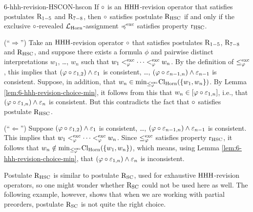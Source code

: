 \begin{thm}{}{6-hhh-revision-HSCON-hscon}%
	If $\circ$ is an ${\mathrm{HHH}}$-revision operator that satisfies postulates $\mathrm{R}_{1-5}$ and $\mathrm{R}_{7-8}$,
	then $\circ$ satisfies postulate $\mathrm{R}_{{\mathrm{HSC}}}$
	if and only if
	the exclusive $\circ$-revealed $\mathcal{L}_{\mathrm{Horn}}$-assignment 
	$\preccurlyeq^{{\operatorname{exc}}}$ satisfies property $\mathrm{r}_{{\mathrm{HSC}}}$.
\end{thm}
\begin{prf*}{}{}%
	(``$\Rightarrow$'')
	Take an ${\mathrm{HHH}}$-revision operator $\circ$ that
	satisfies postulates $\mathrm{R}_{1-5}$, $\mathrm{R}_{7-8}$ and $\mathrm{R}_{{\mathrm{HSC}}}$,
	and suppose there exists a formula $\phi$
	and pairwise distinct interpretations 
	$w_1$, \dots, $w_n$ such that
	$w_1 <^{{\operatorname{exc}}}_{\varphi}\dots <^{{\operatorname{exc}}}_{\varphi} w_n$.
	By the definition of $\le^{{\operatorname{exc}}}_{\varphi}$,
	this implies that 
	$(\varphi\circ\varepsilon_{1,2})\land\varepsilon_{1}$ is consistent,
	\dots,
	$(\varphi\circ\varepsilon_{n-1,n})\land\varepsilon_{n-1}$ is consistent.
	Suppose, in addition, that $w_n \in{\operatorname{min}}_{\le^{{\operatorname{exc}}}_{\varphi}}{\operatorname{Cl}}_{\mathrm{Horn}}(\{w_1,w_n\})$.
	By Lemma \ref{lem:6-hhh-revision-choice-min},
	it follows from this that $w_n\in[\varphi\circ\varepsilon_{1,n}]$,
	i.e., that $(\varphi\circ\varepsilon_{1,n})\land\varepsilon_{n}$ is consistent.
	But this contradicts the fact that $\circ$ satisfies postulate $\mathrm{R}_{{\mathrm{HSC}}}$.

	(``$\Leftarrow$'')
	Suppose
	$(\varphi\circ\varepsilon_{1,2})\land\varepsilon_{1}$ is consistent,
	\dots,
	$(\varphi\circ\varepsilon_{n-1,n})\land\varepsilon_{n-1}$ is consistent.
	This implies that 
	$w_1 <^{{\operatorname{exc}}}_{\varphi}\dots <^{{\operatorname{exc}}}_{\varphi} w_n$.
	Since $\le^{{\operatorname{exc}}}_{\varphi}$ satisfies property $\mathrm{r}_{{\mathrm{HSC}}}$,
	it follows that 
	$w_n \notin{\operatorname{min}}_{\le^{{\operatorname{exc}}}_{\varphi}}{\operatorname{Cl}}_{\mathrm{Horn}}(\{w_1,w_n\})$,
	which means, using Lemma \ref{lem:6-hhh-revision-choice-min},
	that $(\varphi\circ\varepsilon_{1,n})\land\varepsilon_{n}$ is inconsistent.
\end{prf*}

Postulate $\mathrm{R}_{{\mathrm{HSC}}}$ is similar to postulate $\mathrm{R}_{{\mathrm{SC}}}$, used 
for exhaustive ${\mathrm{HHH}}$-revision operators,
so one might wonder whether $\mathrm{R}_{{\mathrm{SC}}}$ could not be used here as well.
The following example, however, shows that when we are working with partial preorders,
postulate $\mathrm{R}_{{\mathrm{SC}}}$ is not quite the right choice.

